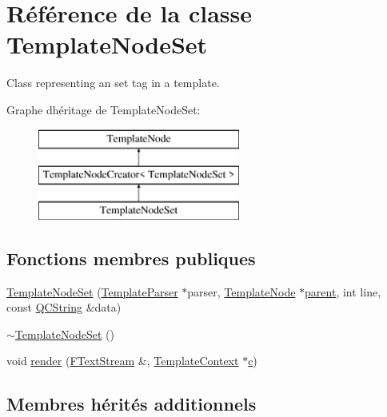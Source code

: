 \hypertarget{class_template_node_set}{}\section{Référence de la classe Template\+Node\+Set}
\label{class_template_node_set}


Class representing an \textquotesingle{}set\textquotesingle{} tag in a template.  


Graphe d\textquotesingle{}héritage de Template\+Node\+Set\+:\begin{figure}[H]
\begin{center}
\leavevmode
\includegraphics[height=3.000000cm]{class_template_node_set}
\end{center}
\end{figure}
\subsection*{Fonctions membres publiques}
\begin{DoxyCompactItemize}
\item 
\hyperlink{class_template_node_set_a505e79d778a7682703a23c87237706a1}{Template\+Node\+Set} (\hyperlink{class_template_parser}{Template\+Parser} $\ast$parser, \hyperlink{class_template_node}{Template\+Node} $\ast$\hyperlink{class_template_node_a69a306ef84e62af9fe57bf9aacc94536}{parent}, int line, const \hyperlink{class_q_c_string}{Q\+C\+String} \&data)
\item 
\hyperlink{class_template_node_set_a3057f454c3c4428910ed4b61b576c3d5}{$\sim$\+Template\+Node\+Set} ()
\item 
void \hyperlink{class_template_node_set_a2452353d5770fe798175ddc17e820ba8}{render} (\hyperlink{class_f_text_stream}{F\+Text\+Stream} \&, \hyperlink{class_template_context}{Template\+Context} $\ast$\hyperlink{060__command__switch_8tcl_ab14f56bc3bd7680490ece4ad7815465f}{c})
\end{DoxyCompactItemize}
\subsection*{Membres hérités additionnels}


